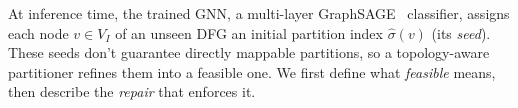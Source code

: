 \documentclass[runningheads]{llncs}
\begin{document}






At inference time, the trained GNN, a multi-layer GraphSAGE~\cite{hamilton2017inductive} classifier, assigns each node $v \in V_I$ of an unseen DFG an initial partition index $\hat{\sigma}(v)$ (its \emph{seed}). These seeds don't guarantee directly mappable partitions, so a topology-aware partitioner refines them into a feasible one. We first define what \emph{feasible} means, then describe the \emph{repair} that enforces it.
\end{document}
